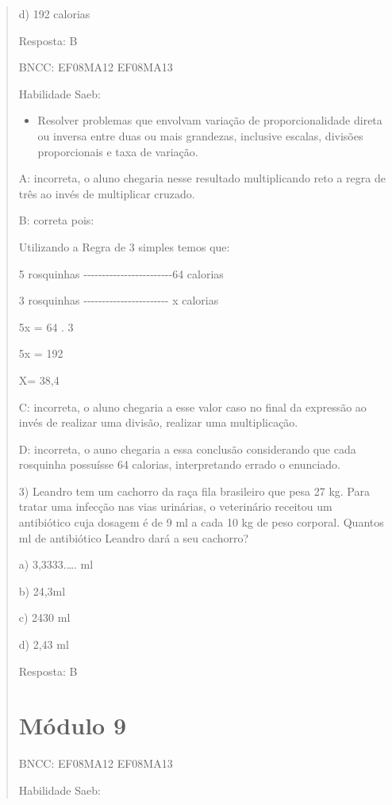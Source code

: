 \begin{quote}
\begin{escolha}
d) 192 calorias

Resposta: B

BNCC: EF08MA12 EF08MA13

Habilidade Saeb:

\begin{itemize}
\tightlist
\item
  Resolver problemas que envolvam variação de proporcionalidade direta
  ou inversa entre duas ou mais grandezas, inclusive escalas, divisões
  proporcionais e taxa de variação.
\end{itemize}

A: incorreta, o aluno chegaria nesse resultado multiplicando reto a
regra de três ao invés de multiplicar cruzado.

B: correta pois:

Utilizando a Regra de 3 simples temos que:

5 rosquinhas
-\/-\/-\/-\/-\/-\/-\/-\/-\/-\/-\/-\/-\/-\/-\/-\/-\/-\/-\/-\/-\/-\/-\/-64
calorias

3 rosquinhas
-\/-\/-\/-\/-\/-\/-\/-\/-\/-\/-\/-\/-\/-\/-\/-\/-\/-\/-\/-\/-\/-\/- x
calorias

5x = 64 . 3

5x = 192

X= 38,4

C: incorreta, o aluno chegaria a esse valor caso no final da expressão
ao invés de realizar uma divisão, realizar uma multiplicação.

D: incorreta, o auno chegaria a essa conclusão considerando que cada
rosquinha possuísse 64 calorias, interpretando errado o enunciado.

3) Leandro tem um cachorro da raça fila brasileiro que pesa 27 kg. Para
tratar uma infecção nas vias urinárias, o veterinário receitou um
antibiótico cuja dosagem é de 9 ml a cada 10 kg de peso corporal.
Quantos ml de antibiótico Leandro dará a seu cachorro?

a) 3,3333.\ldots. ml

b) 24,3ml

c) 2430 ml

d) 2,43 ml

Resposta: B

\chapter{Módulo 9}

BNCC: EF08MA12 EF08MA13

Habilidade Saeb:


\end{escolha}
\end{quote}
